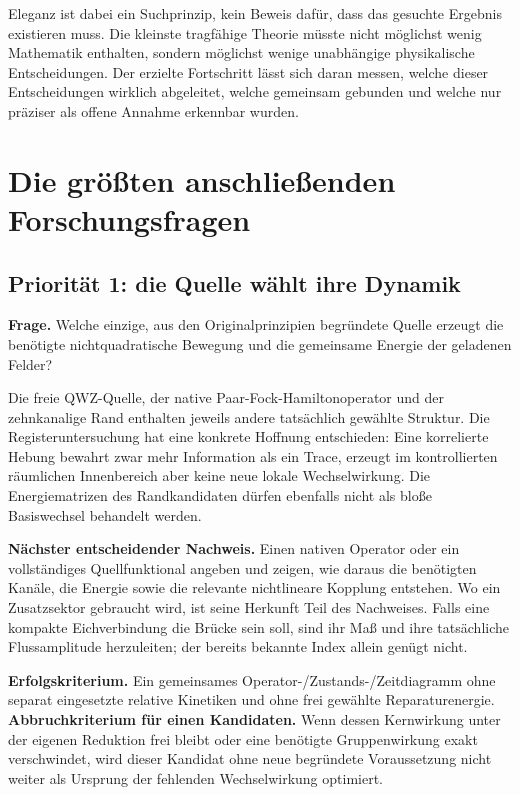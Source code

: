 Eleganz ist dabei ein Suchprinzip, kein Beweis dafür, dass das gesuchte Ergebnis existieren muss. Die kleinste tragfähige Theorie müsste nicht möglichst wenig Mathematik enthalten, sondern möglichst wenige unabhängige physikalische Entscheidungen. Der erzielte Fortschritt lässt sich daran messen, welche dieser Entscheidungen wirklich abgeleitet, welche gemeinsam gebunden und welche nur präziser als offene Annahme erkennbar wurden.

\chapter{Die größten anschließenden Forschungsfragen}
\section{Priorität 1: die Quelle wählt ihre Dynamik}
\textbf{Frage.} Welche einzige, aus den Originalprinzipien begründete Quelle erzeugt die benötigte nichtquadratische Bewegung und die gemeinsame Energie der geladenen Felder?

Die freie QWZ-Quelle, der native Paar-Fock-Hamiltonoperator und der zehnkanalige Rand enthalten jeweils andere tatsächlich gewählte Struktur. Die Registeruntersuchung hat eine konkrete Hoffnung entschieden: Eine korrelierte Hebung bewahrt zwar mehr Information als ein Trace, erzeugt im kontrollierten räumlichen Innenbereich aber keine neue lokale Wechselwirkung. Die Energiematrizen des Randkandidaten dürfen ebenfalls nicht als bloße Basiswechsel behandelt werden.

\textbf{Nächster entscheidender Nachweis.} Einen nativen Operator oder ein vollständiges Quellfunktional angeben und zeigen, wie daraus die benötigten Kanäle, die Energie sowie die relevante nichtlineare Kopplung entstehen. Wo ein Zusatzsektor gebraucht wird, ist seine Herkunft Teil des Nachweises. Falls eine kompakte Eichverbindung die Brücke sein soll, sind ihr Maß und ihre tatsächliche Flussamplitude herzuleiten; der bereits bekannte Index allein genügt nicht.

\textbf{Erfolgskriterium.} Ein gemeinsames Operator-/Zustands-/Zeitdiagramm ohne separat eingesetzte relative Kinetiken und ohne frei gewählte Reparaturenergie. \textbf{Abbruchkriterium für einen Kandidaten.} Wenn dessen Kernwirkung unter der eigenen Reduktion frei bleibt oder eine benötigte Gruppenwirkung exakt verschwindet, wird dieser Kandidat ohne neue begründete Voraussetzung nicht weiter als Ursprung der fehlenden Wechselwirkung optimiert.

